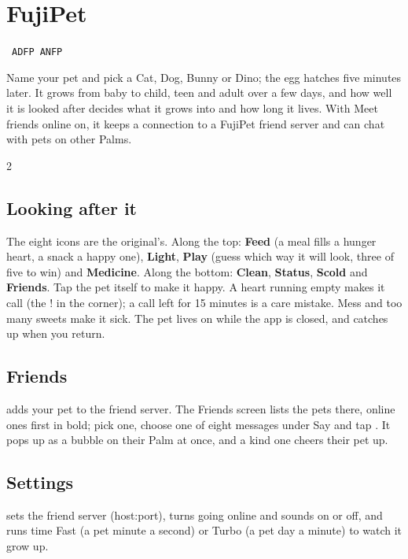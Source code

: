 \newpage
\section{FujiPet}\label{app:fujipet}
  {\fnbadge\ \texttt{ADFP}\qquad \fibadge\ \texttt{ANFP}}

Name your pet and pick a Cat, Dog, Bunny or Dino; the egg hatches five
minutes later. It grows from baby to child, teen and adult over a few days,
and how well it is looked after decides what it grows into and how long it
lives. With \textsf{Meet friends online} on, it keeps a connection to a
FujiPet friend server and can chat with pets on other Palms.

\begin{center}
\hfill
{}\hfill
{}
\end{center}

\begin{multicols}{2}
\subsection*{Looking after it}
The eight icons are the original's. Along the top: \textbf{Feed} (a meal
fills a hunger heart, a snack a happy one), \textbf{Light}, \textbf{Play}
(guess which way it will look, three of five to win) and \textbf{Medicine}.
Along the bottom: \textbf{Clean}, \textbf{Status}, \textbf{Scold} and
\textbf{Friends}. Tap the pet itself to make it happy. A heart running empty makes it call
(the \textsf{!} in the corner); a call left for 15 minutes is a care mistake.
Mess and too many sweets make it sick. The pet lives on while the app is
closed, and catches up when you return.

\subsection*{Friends}
 adds your pet to the friend server. The Friends screen lists
the pets there, online ones first in bold; pick one, choose one of eight
messages under \textsf{Say} and tap . It pops up as a bubble on
their Palm at once, and a kind one cheers their pet up.

\subsection*{Settings}
 sets the friend server (\textsf{host:port}), turns
going online and sounds on or off, and runs time \textsf{Fast} (a pet minute
a second) or \textsf{Turbo} (a pet day a minute) to watch it grow up.
\end{multicols}

\begin{center}
\hfill
{}\hfill
{}
\end{center}
